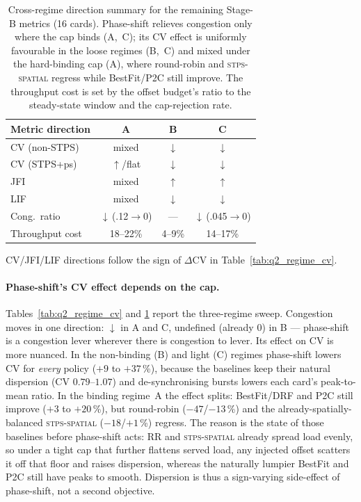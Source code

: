 \documentclass[letterpaper,twocolumn,10pt]{article}
\begin{document}
\begin{table}[t]
\centering
\caption{Cross-regime direction summary for the remaining Stage-B metrics (16 cards). Phase-shift relieves congestion only where the cap binds (A,~C); its CV effect is uniformly favourable in the loose regimes (B,~C) and mixed under the hard-binding cap (A), where round-robin and \textsc{stps-spatial} regress while BestFit/P2C still improve. The throughput cost is set by the offset budget's ratio to the steady-state window and the cap-rejection rate.}
\label{tab:q2_regime_multi}
\small
\setlength{\tabcolsep}{4pt}
\begin{tabular}{@{}lccc@{}}
\toprule
Metric direction & A & B & C \\
\midrule
CV (non-STPS)    & mixed & $\downarrow$ & $\downarrow$ \\
CV (STPS+ps)     & $\uparrow$/flat & $\downarrow$ & $\downarrow$ \\
JFI              & mixed & $\uparrow$   & $\uparrow$ \\
LIF              & mixed & $\downarrow$ & $\downarrow$ \\
Cong.\ ratio     & $\downarrow$\,(.12$\to$0) & --- & $\downarrow$\,(.045$\to$0) \\
Throughput cost  & 18--22\% & 4--9\% & 14--17\% \\
\bottomrule
\end{tabular}

\smallskip
{\footnotesize CV/JFI/LIF directions follow the sign of $\Delta$CV in Table~\ref{tab:q2_regime_cv}.}
\end{table}

\paragraph{Phase-shift's CV effect depends on the cap.} Tables~\ref{tab:q2_regime_cv} and \ref{tab:q2_regime_multi} report the three-regime sweep. Congestion moves in one direction: $\downarrow$ in A and C, undefined (already 0) in B --- phase-shift is a congestion lever wherever there is congestion to lever. Its effect on CV is more nuanced. In the non-binding (B) and light (C) regimes phase-shift lowers CV for \emph{every} policy ($+9$ to $+37$\,\%), because the baselines keep their natural dispersion (CV $0.79$--$1.07$) and de-synchronising bursts lowers each card's peak-to-mean ratio. In the binding regime~A the effect splits: BestFit/DRF and P2C still improve ($+3$ to $+20$\,\%), but round-robin ($-47$/$-13$\,\%) and the already-spatially-balanced \textsc{stps-spatial} ($-18$/$+1$\,\%) regress. The reason is the state of those baselines before phase-shift acts: RR and \textsc{stps-spatial} already spread load evenly, so under a tight cap that further flattens served load, any injected offset scatters it off that floor and raises dispersion, whereas the naturally lumpier BestFit and P2C still have peaks to smooth. Dispersion is thus a sign-varying side-effect of phase-shift, not a second objective.
\end{document}

